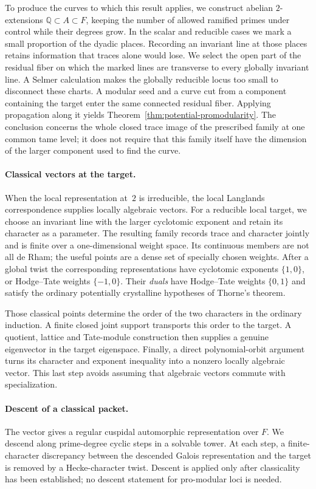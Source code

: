 To produce the curves to which this result applies, we construct
abelian \(2\)-extensions \(\mathbb Q\subset A\subset F\), keeping the
number of allowed ramified primes under control while their degrees
grow. In the scalar and reducible cases we mark a small proportion of
the dyadic places. Recording an invariant line at those places retains
information that traces alone would lose. We select the open part of
the residual fiber on which the marked lines are transverse to every
globally invariant line. A Selmer calculation makes the globally
reducible locus too small to disconnect these charts. A modular seed
and a curve cut from a component containing the target enter the same
connected residual fiber. Applying propagation along it yields
Theorem~\ref{thm:potential-promodularity}. The conclusion concerns the
whole closed trace image of the prescribed family at one common tame
level; it does not require that this family itself have the dimension
of the larger component used to find the curve.

\paragraph{Classical vectors at the target.}
When the local representation at~\(2\) is irreducible, the local
Langlands correspondence supplies locally algebraic vectors. For a
reducible local target, we choose an invariant line with the larger
cyclotomic exponent and retain its character as a parameter. The
resulting family records trace and character jointly and is finite
over a one-dimensional weight space. Its continuous members are not
all de Rham; the useful points are a dense set of specially chosen
weights. After a global twist the corresponding representations have
cyclotomic exponents \(\{1,0\}\), or Hodge--Tate weights
\(\{-1,0\}\). Their \emph{duals} have Hodge--Tate weights
\(\{0,1\}\) and satisfy the ordinary potentially crystalline
hypotheses of Thorne's theorem.

Those classical points determine the order of the two characters in
the ordinary induction. A finite closed joint support transports this
order to the target. A quotient, lattice and Tate-module construction
then supplies a genuine eigenvector in the target eigenspace. Finally,
a direct polynomial-orbit argument turns its character and exponent
inequality into a nonzero locally algebraic vector. This last step
avoids assuming that algebraic vectors commute with specialization.

\paragraph{Descent of a classical packet.}
The vector gives a regular cuspidal automorphic representation over
\(F\). We descend along prime-degree cyclic steps in a solvable tower.
At each step, a finite-character discrepancy between the descended
Galois representation and the target is removed by a Hecke-character
twist. Descent is applied only after classicality has been established;
no descent statement for pro-modular loci is needed.

